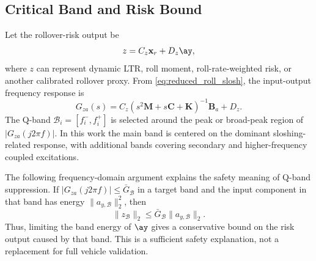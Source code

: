\subsection{Critical Band and Risk Bound}
Let the rollover-risk output be
\begin{equation}
    z=C_z\mathbf{x}_r+D_z\ay ,
\end{equation}
where $z$ can represent dynamic LTR, roll moment, roll-rate-weighted risk, or another calibrated rollover proxy. From \eqref{eq:reduced_roll_slosh}, the input-output frequency response is
\begin{equation}
    G_{za}(s)=C_z(s^2\mathbf{M}+s\mathbf{C}+\mathbf{K})^{-1}\mathbf{B}_a+D_z .
    \label{eq:freq_response}
\end{equation}
The Q-band $\mathcal{B}_i=[f_i^-,f_i^+]$ is selected around the peak or broad-peak region of $|G_{za}(j2\pi f)|$. In this work the main band is centered on the dominant sloshing-related response, with additional bands covering secondary and higher-frequency coupled excitations.

The following frequency-domain argument explains the safety meaning of Q-band suppression. If $|G_{za}(j2\pi f)|\leq \bar{G}_{\mathcal{B}}$ in a target band and the input component in that band has energy $\|a_{y,\mathcal{B}}\|_2^2$, then
\begin{equation}
    \|z_{\mathcal{B}}\|_2 \leq \bar{G}_{\mathcal{B}}\|a_{y,\mathcal{B}}\|_2 .
\end{equation}
Thus, limiting the band energy of $\ay$ gives a conservative bound on the risk output caused by that band. This is a sufficient safety explanation, not a replacement for full vehicle validation.


